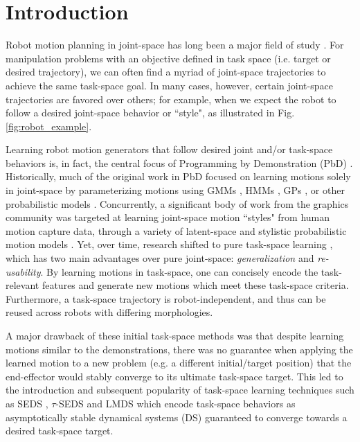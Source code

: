 \documentclass[letterpaper, 10 pt, conference,fleqn]{ieeeconf}
\begin{document}



\IEEEpeerreviewmaketitle
\section{Introduction}
\label{sec:intro}
Robot motion planning in joint-space has long been a major field of study \cite{kelly2006control}. For manipulation problems with an objective defined in task space (i.e. target or desired trajectory), we can often find a myriad of joint-space trajectories to achieve the same task-space goal. In many cases, however, certain joint-space trajectories are favored over others; for example, when we expect the robot to follow a desired joint-space behavior or ``style", as illustrated in Fig. \ref{fig:robot_example}. 

Learning robot motion generators that follow desired joint and/or task-space behaviors is, in fact, the central focus of Programming by Demonstration (PbD) \cite{billard2008robot} \cite{Argall:RAS:2009}. Historically, much of the original work in PbD focused on learning motions solely in joint-space by parameterizing motions using GMMs \cite{Calinon:HRI:2007}, HMMs \cite{Garrido:Neuro:2015}, GPs \cite{Shon:HUM:2005}, or other probabilistic models \cite{Schaal:IROS:2003,Schaal:AI:2002}. Concurrently, a significant body of work from the graphics community was targeted at learning joint-space motion ``styles" from human motion capture data, through a variety of latent-space and stylistic probabilistic motion models \cite{gielniak2010stylized,grochow2004style}. Yet, over time, research shifted to pure task-space learning \cite{Pastor:ICRA:2009,Gribovskaya:IJRR:2011,Calinon:ISR:2015}, which has two main advantages over pure joint-space: \textit{generalization} and \textit{re-usability}. By learning motions in task-space, one can concisely encode the task-relevant features and generate new motions which meet these task-space criteria. Furthermore, a task-space trajectory is robot-independent, and thus can be reused across robots with differing morphologies.

A major drawback of these initial task-space methods was that despite learning motions similar to the demonstrations, there was no guarantee when applying the learned motion to a new problem (e.g. a different initial/target position) that the end-effector would stably converge to its ultimate task-space target. This led to the introduction and subsequent popularity of task-space learning techniques such as SEDS \cite{khansari2011learning}, $\tau$-SEDS \cite{Neumann:RAS:2015}  and LMDS \cite{Kronander:RAS:2015} which encode task-space behaviors as asymptotically stable dynamical systems (DS) guaranteed to converge towards a desired task-space target.
\end{document}
